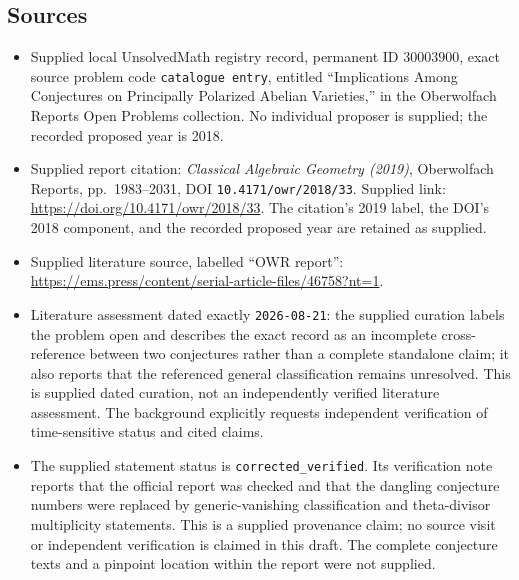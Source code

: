 \documentclass[11pt]{article}
\begin{document}
\subsection{Sources}
\begin{itemize}
\item Supplied local UnsolvedMath registry record, permanent ID \(30003900\), exact source problem code \texttt{catalogue entry}, entitled ``Implications Among Conjectures on Principally Polarized Abelian Varieties,'' in the Oberwolfach Reports Open Problems collection. No individual proposer is supplied; the recorded proposed year is 2018.
\item Supplied report citation: \emph{Classical Algebraic Geometry (2019)}, Oberwolfach Reports, pp.~1983--2031, DOI \texttt{10.4171/owr/2018/33}. Supplied link: \url{https://doi.org/10.4171/owr/2018/33}. The citation's 2019 label, the DOI's 2018 component, and the recorded proposed year are retained as supplied.
\item Supplied literature source, labelled ``OWR report'': \url{https://ems.press/content/serial-article-files/46758?nt=1}.
\item Literature assessment dated exactly \texttt{2026-08-21}: the supplied curation labels the problem open and describes the exact record as an incomplete cross-reference between two conjectures rather than a complete standalone claim; it also reports that the referenced general classification remains unresolved. This is supplied dated curation, not an independently verified literature assessment. The background explicitly requests independent verification of time-sensitive status and cited claims.
\item The supplied statement status is \texttt{corrected\_verified}. Its verification note reports that the official report was checked and that the dangling conjecture numbers were replaced by generic-vanishing classification and theta-divisor multiplicity statements. This is a supplied provenance claim; no source visit or independent verification is claimed in this draft. The complete conjecture texts and a pinpoint location within the report were not supplied.
\end{itemize}
\end{document}
